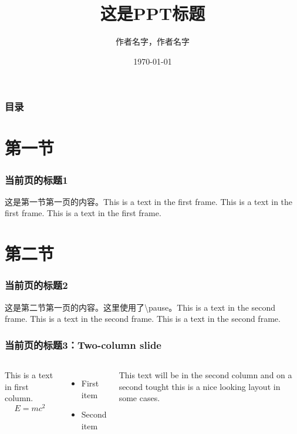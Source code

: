 \documentclass{beamer}
\begin{document}
	\title{这是PPT标题}  %
	\author{作者名字，作者名字}     %
	\date{\today}        %
	
	\begin{frame}    %
		\titlepage   %
	\end{frame}
	\begin{frame}    %
		\frametitle{目录} %
		\tableofcontents  %
	\end{frame}
	
	\section{第一节}    %
	\begin{frame}   %
		\frametitle{当前页的标题1}   %
		这是第一节第一页的内容。This is a text in the first frame. This is a text in the first frame. This is a text in the first frame.
	\end{frame}
	
	\section{第二节}  %
	\begin{frame}   %
		\frametitle{当前页的标题2}   %
		这是第二节第一页的内容。这里使用了\textbackslash pause。\pause This is a text in the second frame. This is a text in the second frame. This is a text in the second frame.  %
	\end{frame}
	\begin{frame}
		\frametitle{当前页的标题3：Two-column slide}
		\begin{columns}   %
			This is a text in first column.
			$$E=mc^2$$
			\begin{itemize}  %
				\item First item
				\item Second item
			\end{itemize}
			This text will be in the second column
			and on a second tought this is a nice looking
			layout in some cases.
		\end{columns}
	\end{frame}
\end{document}
